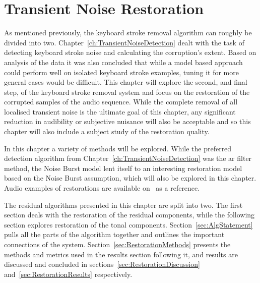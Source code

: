 \chapter{Transient Noise Restoration}\label{ch:TransientNoiseRestoration}

\ifpdf
    \graphicspath{{Chapter6_TransNoiseRest/Chapter6Figs/PNG/}{Chapter6_TransNoiseRest/Chapter6Figs/PDF/}{Chapter6_TransNoiseRest/Chapter6Figs/}{Chapter6_TransNoiseRest/Chapter6Figs/Subjective/}{Chapter6_TransNoiseRest/Chapter6Figs/Results/}{Chapter6_TransNoiseRest/Chapter6Figs/waveformResultsFinalHello123/}}
\else
    \graphicspath{{Chapter6_TransNoiseRest/Chapter6Figs/EPS/}{Chapter6_TransNoiseRest/Chapter6Figs/}}
\fi

As mentioned previously, the keyboard stroke removal algorithm can roughly be divided into two. Chapter~\ref{ch:TransientNoiseDetection} dealt with the task of detecting keyboard stroke noise and calculating the corruption's extent. Based on analysis of the data it was also concluded that while a model based approach could perform well on isolated keyboard stroke examples, tuning it for more general cases would be difficult. This chapter will explore the second, and final step, of the keyboard stroke removal system and focus on the restoration of the corrupted samples of the audio sequence. While the complete removal of all localised transient noise is the ultimate goal of this chapter, any significant reduction in audibility or subjective nuisance will also be acceptable and so this chapter will also include a subject study of the restoration quality.

In this chapter a variety of methods will be explored. While the preferred detection algorithm from Chapter~\ref{ch:TransientNoiseDetection} was the \gls{ar} filter method, the Noise Burst model lent itself to an interesting restoration model based on the Noise Burst assumption, which will also be explored in this chapter. Audio examples of restorations are available on \siteURL~as a reference.

The residual algorithms presented in this chapter are split into two. The first section deals with the restoration of the residual components, while the following section explores restoration of the tonal components. Section~\ref{sec:AlgStatement} pulls all the parts of the algorithm together and outlines the important connections of the system. Section~\ref{sec:RestorationMethods} presents the methods and metrics used in the results section following it, and results are discussed and concluded in sections~\ref{sec:RestorationDiscussion} and~\ref{sec:RestorationResults} respectively.

